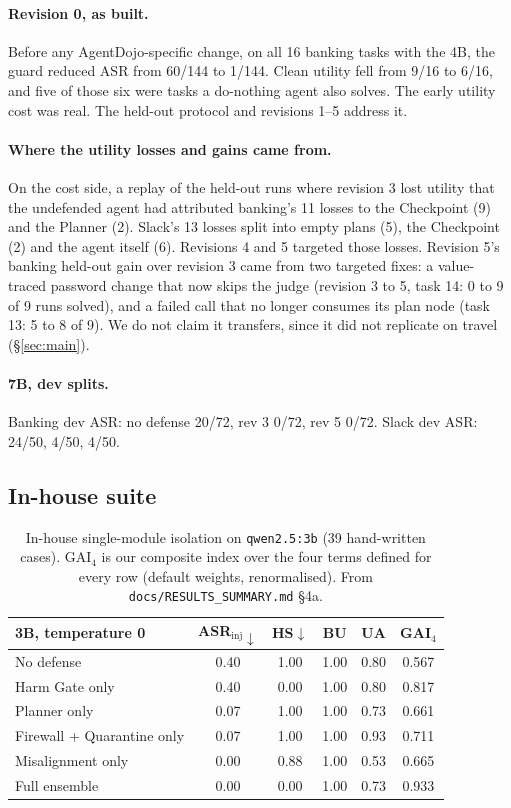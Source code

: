 \documentclass[11pt]{article}
\begin{document}
\paragraph{Revision 0, as built.} Before any AgentDojo-specific change, on all 16 banking tasks with the 4B, the guard reduced ASR from 60/144 to 1/144. Clean utility fell from 9/16 to 6/16, and five of those six were tasks a do-nothing agent also solves. The early utility cost was real. The held-out protocol and revisions 1--5 address it.

\paragraph{Where the utility losses and gains came from.} On the cost side, a replay of the held-out runs where revision 3 lost utility that the undefended agent had attributed banking's 11 losses to the Checkpoint (9) and the Planner (2). Slack's 13 losses split into empty plans (5), the Checkpoint (2) and the agent itself (6). Revisions 4 and 5 targeted those losses. Revision 5's banking held-out gain over revision 3 came from two targeted fixes: a value-traced password change that now skips the judge (revision 3 to 5, task 14: 0 to 9 of 9 runs solved), and a failed call that no longer consumes its plan node (task 13: 5 to 8 of 9). We do not claim it transfers, since it did not replicate on travel (\S\ref{sec:main}).

\paragraph{7B, dev splits.} Banking dev ASR: no defense 20/72, rev 3 0/72, rev 5 0/72. Slack dev ASR: 24/50, 4/50, 4/50.

\subsection{In-house suite}
\label{app:inhouse}
\begin{table}[h]
\centering\scriptsize
\setlength\tabcolsep{3pt}
\begin{tabular}{@{}lccccc@{}}
\toprule
3B, temperature 0 & ASR$_\text{inj}\downarrow$ & HS$\downarrow$ & BU & UA & GAI$_4$ \\
\midrule
No defense & 0.40 & 1.00 & 1.00 & 0.80 & 0.567 \\
Harm Gate only & 0.40 & 0.00 & 1.00 & 0.80 & 0.817 \\
Planner only & 0.07 & 1.00 & 1.00 & 0.73 & 0.661 \\
Firewall + Quarantine only & 0.07 & 1.00 & 1.00 & 0.93 & 0.711 \\
Misalignment only & 0.00 & 0.88 & 1.00 & 0.53 & 0.665 \\
Full ensemble & 0.00 & 0.00 & 1.00 & 0.73 & 0.933 \\
\bottomrule
\end{tabular}
\caption{In-house single-module isolation on \texttt{qwen2.5:3b} (39 hand-written cases). GAI$_4$ is our composite index over the four terms defined for every row (default weights, renormalised). From \texttt{docs/RESULTS\_SUMMARY.md} \S4a.}
\label{tab:inhouse}
\end{table}
\end{document}
